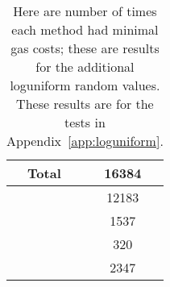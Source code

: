 \begin{table}[p]
\centering
\begin{tabular}{|c|S[table-format=5.0]|}
\hline
Total & 16384 \\
\hline
{} \UnrolledThree{} &  12183 \\
\WhileOne{}      &  1537 \\
\WhileTwo{}      &   320 \\
\WhileThree{}    &  2347 \\
\hline
\end{tabular}
\caption[Minimal Gas Costs Statistics]{Here are number of times
    each method had minimal gas costs;
    these are results for the additional loguniform random values.
    These results are for the tests in Appendix~\ref{app:loguniform}.
    }
\label{table:minimal_gas_costs_er}
\end{table}
